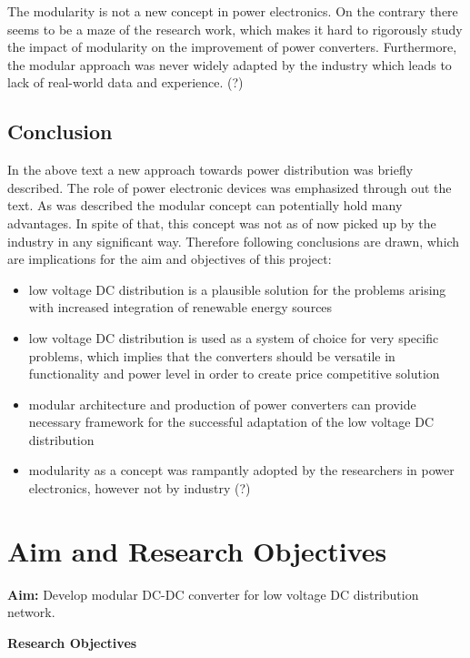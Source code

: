 \documentclass[]{scrreprt}
\begin{document}
The modularity is not a new concept in power electronics. On the contrary there seems to be a maze of the research work, which makes it hard to rigorously study the impact of modularity on the improvement of power converters. Furthermore, the modular approach was never widely adapted by the industry which leads to lack of real-world data and experience. (?)


\section{Conclusion}

In the above text a new approach towards power distribution was briefly described. The role of power electronic devices was emphasized through out the text. As was described the modular concept can potentially hold many advantages. In spite of that, this concept was not as of now picked up by the industry in any significant way. Therefore following conclusions are drawn, which are implications for the aim and objectives of this project:
\begin{itemize}
	\item low voltage DC distribution is a plausible solution for the problems arising with increased integration of renewable energy sources
	\item low voltage DC distribution is used as a system of choice for very specific problems, which implies that the converters should be versatile in functionality and power level in order to create price competitive solution
	\item modular architecture and production of power converters can provide necessary framework for the successful adaptation of the low voltage DC  distribution
	\item modularity as a concept was rampantly adopted by the researchers in power electronics, however not by industry (?)
\end{itemize}

\chapter{Aim and Research Objectives}

\textbf{Aim:} Develop modular DC-DC converter for low voltage DC distribution network.
 
 \vspace{10mm}

\textbf{Research Objectives}
\end{document}
